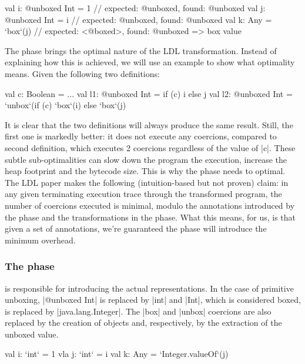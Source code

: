 \begin{lstlisting-nobreak}
val i: @unboxed Int = 1 // expected: @unboxed, found: @unboxed
val j: @unboxed Int = i // expected: @unboxed, found: @unboxed
val k: Any = `box`(j)             // expected:  <@boxed>, found: @unboxed => box value
\end{lstlisting-nobreak}

The \coerce{} phase brings the optimal nature of the LDL transformation. Instead of explaining how this is achieved, we will use an example to show what optimality means. Given the following two definitions:

\begin{lstlisting-nobreak}
val c: Boolean = ...
val l1: @unboxed Int = if (c) i else j
val l2: @unboxed Int = `unbox`(if (c) `box`(i) else `box`(j)
\end{lstlisting-nobreak}

It is clear that the two definitions will always produce the same result. Still, the first one is markedly better: it does not execute any coercions, compared to second definition, which executes 2 coercions regardless of the value of |c|. These subtle sub-optimalities can slow down the program the execution, increase the heap footprint and the bytecode size. This is why the \coerce{} phase needs to optimal. The LDL paper \cite{ldl} makes the following (intuition-based but not proven) claim: in any given terminating execution trace through the transformed  program, the number of coercions executed is minimal, modulo the annotations introduced by the \inject{} phase and the transformations in the \commit{} phase. What this means, for us, is that given a set of annotations, we're guaranteed the \coerce{} phase will introduce the minimum overhead.

\subsubsection{The \commit{} phase} is responsible for introducing the actual representations. In the case of primitive unboxing, |@unboxed Int| is replaced by |int| and |Int|, which is considered boxed, is replaced by |java.lang.Integer|. The |box| and |unbox| coercions are also replaced by the creation of objects and, respectively, by the extraction of the unboxed value.

\begin{lstlisting-nobreak}
val i: `int` = 1
vla j: `int` = i
val k: Any = `Integer.valueOf`(j)
\end{lstlisting-nobreak}

